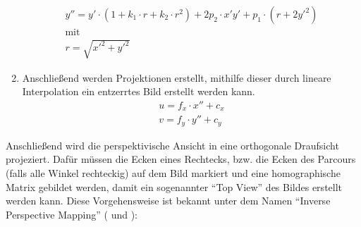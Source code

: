 \begin{enumerate}
\begin{gather*}
	{y}'' = y'\cdot \left ( 1+k_1\cdot r + k_2\cdot r^2 \right )+2 p_2\cdot x'y'+p_1\cdot \left ( r+2{y}'^2 \right )\\[1mm] \text{mit} \\[1mm]
	r=\sqrt{{x}'^2+{y}'^2}
	\end{gather*}
	\item Anschließend werden Projektionen erstellt, mithilfe dieser durch lineare Interpolation ein entzerrtes Bild erstellt werden kann. 
	\begin{align*}
	u = f_x \cdot {x}'' + c_x\\
	v = f_y \cdot {y}'' + c_y
	\end{align*}
\end{enumerate}

Anschließend wird die perspektivische Ansicht in eine orthogonale Draufsicht projeziert. Dafür müssen die Ecken eines Rechtecks, bzw. die Ecken des Parcours (falls alle Winkel rechteckig) auf dem Bild markiert und eine homographische Matrix gebildet werden, damit ein sogenannter "`Top View"' des Bildes erstellt werden kann. Diese Vorgehensweise ist bekannt unter dem Namen "`Inverse Perspective Mapping"' (\cite{Galway} und \cite{Peter}): 
